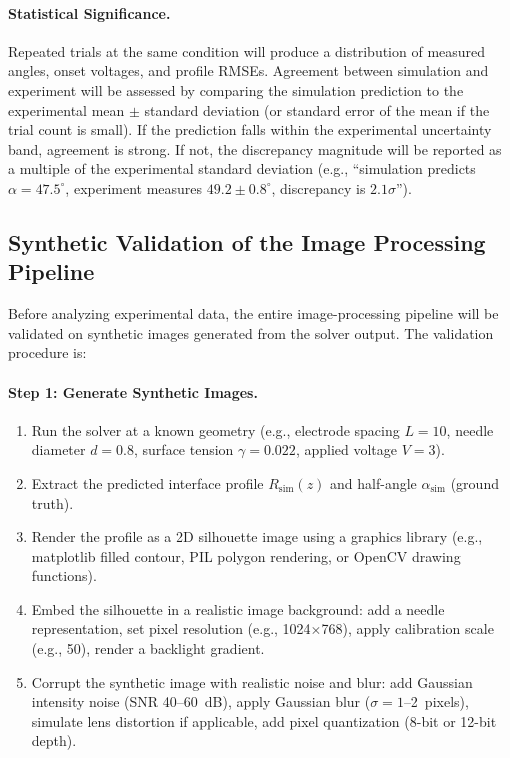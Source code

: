 \paragraph{Statistical Significance.} Repeated trials at the same condition will produce a distribution of measured angles, onset voltages, and profile RMSEs. Agreement between simulation and experiment will be assessed by comparing the simulation prediction to the experimental mean $\pm$ standard deviation (or standard error of the mean if the trial count is small). If the prediction falls within the experimental uncertainty band, agreement is strong. If not, the discrepancy magnitude will be reported as a multiple of the experimental standard deviation (e.g., ``simulation predicts $\alpha = 47.5^{\circ}$, experiment measures $49.2 \pm 0.8^{\circ}$, discrepancy is $2.1 \sigma$'').

\subsection{Synthetic Validation of the Image Processing Pipeline}

Before analyzing experimental data, the entire image-processing pipeline will be validated on synthetic images generated from the solver output. The validation procedure is:

\paragraph{Step 1: Generate Synthetic Images.}
\begin{enumerate}
    \item Run the solver at a known geometry (e.g., electrode spacing $L = 10$, needle diameter $d = 0.8$, surface tension $\gamma = 0.022$, applied voltage $V = 3$).
    \item Extract the predicted interface profile $R_{\mathrm{sim}}(z)$ and half-angle $\alpha_{\mathrm{sim}}$ (ground truth).
    \item Render the profile as a 2D silhouette image using a graphics library (e.g., matplotlib filled contour, PIL polygon rendering, or OpenCV drawing functions).
    \item Embed the silhouette in a realistic image background: add a needle representation, set pixel resolution (e.g., 1024$\times$768), apply calibration scale (e.g., 50), render a backlight gradient.
    \item Corrupt the synthetic image with realistic noise and blur: add Gaussian intensity noise (SNR 40--60~dB), apply Gaussian blur ($\sigma = 1$--2~pixels), simulate lens distortion if applicable, add pixel quantization (8-bit or 12-bit depth).
\end{enumerate}

